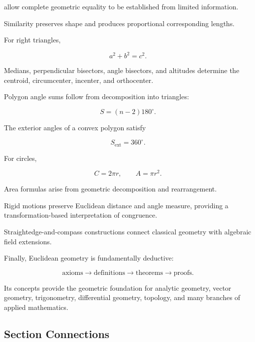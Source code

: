 allow complete geometric equality to be established from limited
information.

Similarity preserves shape and produces proportional corresponding lengths.

For right triangles,

\[ \boxed{a^2+b^2=c^2.} \]

Medians, perpendicular bisectors, angle bisectors, and altitudes determine
the centroid, circumcenter, incenter, and orthocenter.

Polygon angle sums follow from decomposition into triangles:

\[ \boxed{S=(n-2)180^\circ.} \]

The exterior angles of a convex polygon satisfy

\[ \boxed{S_{\mathrm{ext}}=360^\circ.} \]

For circles,

\[ \boxed{C=2\pi r,\qquad A=\pi r^2.} \]

Area formulas arise from geometric decomposition and rearrangement.

Rigid motions preserve Euclidean distance and angle measure, providing a
transformation-based interpretation of congruence.

Straightedge-and-compass constructions connect classical geometry with
algebraic field extensions.

Finally, Euclidean geometry is fundamentally deductive:

\[
\boxed{
\text{axioms}
\longrightarrow
\text{definitions}
\longrightarrow
\text{theorems}
\longrightarrow
\text{proofs}.
}
\]

Its concepts provide the geometric foundation for analytic geometry, vector
geometry, trigonometry, differential geometry, topology, and many branches
of applied mathematics.

\subsection{Section Connections}
\label{subsec:euclidean-geometry-connections}


